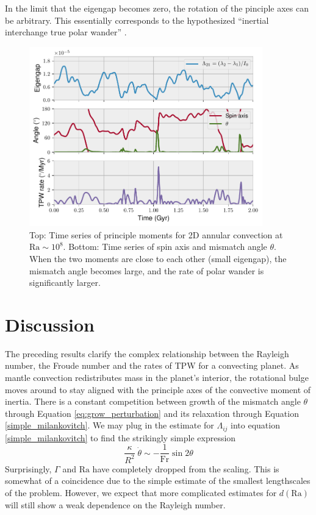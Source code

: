 \documentclass[extra,mreferee]{gji}
\begin{document}
In the limit that the eigengap becomes zero, the rotation of the pinciple axes can be arbitrary. 
This essentially corresponds to the hypothesized ``inertial interchange true polar wander'' \citep{kirschvink1997evidence}.

\begin{figure}
\centering
\label{misfit}
\includegraphics[width=0.9\textwidth]{figures/misfit.pdf}
\caption{Top: Time series of principle moments for 2D annular convection at $\mathrm{Ra}\sim10^8$.  Bottom: Time series of spin axis and mismatch angle $\theta$.  When the two moments are close to each other (small eigengap), the mismatch angle becomes large, and the rate of polar wander is significantly larger.}
\end{figure}



\section{Discussion}

The preceding results clarify the complex relationship between the Rayleigh number, the Froude number and the rates of TPW for a convecting planet.
As mantle convection redistributes mass in the planet's interior, the rotational bulge moves around to stay aligned with the principle axes of the convective moment of inertia. 
There is a constant competition between growth of the mismatch angle $\theta$ through Equation \ref{eq:grow_perturbation} and its relaxation through Equation \ref{simple_milankovitch}.
We may plug in the estimate for $\Lambda_{ij}$ into equation \ref{simple_milankovitch} to find the strikingly simple expression
\begin{equation}
\frac{\kappa}{R^2} \; \dot{\theta} \sim -\frac{1}{\mathrm{Fr}} \sin{2 \theta}
\label{eq:simplest_milankovitch}
\end{equation}
Surprisingly, $\Gamma$ and $\mathrm{Ra}$ have completely dropped from the scaling. 
This is somewhat of a coincidence due to the simple estimate of the smallest lengthscales of the problem.
However, we expect that more complicated estimates for $d(\mathrm{Ra})$ will still show a weak dependence on the Rayleigh number.
\end{document}
